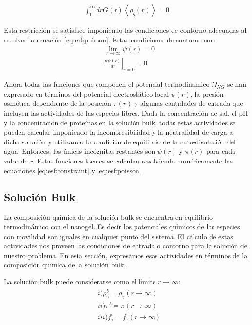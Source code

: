 \begin{align}
	\int_0^\infty{drG(r) \left<\rho_q(r)\right>} = 0
\end{align}

Esta restricci\'on se satisface imponiendo las condiciones de contorno adecuadas al resolver la ecuaci\'on \ref{eq:esf:poisson}. Estas condiciones de contorno son:
\begin{align}
	&  \lim_{r\to\infty}\psi(r) = 0 \\
	&  \left.\frac{d\psi(r)}{dr}\right|_{r=0} = 0
	\label{eq:esf:contorno}
	\end{align}
	

Ahora todas las funciones que componen el potencial termodin\'amico $\Omega_{NG}$ se han expresado en t\'erminos del potencial electrost\'atico local $\psi(r)$, la presi\'on osm\'otica dependiente de la posici\'on $\pi(r)$ y algunas cantidades de entrada que incluyen las actividades de las especies libres.
Dada la concentraci\'on de sal, el pH y la concentraci\'on de prote\'inas en la soluci\'on bulk, todas estas actividades se pueden calcular imponiendo la incompresibilidad y la neutralidad de carga a dicha soluci\'on y utilizando la condici\'on de equilibrio de la auto-disoluci\'on del agua.
Entonces, las \'unicas inc\'ognitas restantes son $\psi(r)$ y $\pi(r)$ para cada valor de $r$.
Estas funciones locales se calculan resolviendo num\'ericamente las ecuaciones \ref{eq:esf:constraint} y \ref{eq:esf:poisson}.
 

\subsection{Soluci\'on Bulk}\label{sec:esf:bulk}

La composici\'on qu\'imica de la soluci\'on bulk se encuentra en equilibrio termodin\'amico con el nanogel. Es decir los potenciales qu\'imicos de las especies con movilidad son iguales en cualquier punto del sistema. 
El c\'alculo de estas actividades nos proveen  las condiciones de entrada o contorno para la soluci\'on de nuestro problema.
En esta secci\'on, expresamos esas actividades en t\'erminos de la composici\'on qu\'imica de la soluci\'on bulk.

La soluci\'on bulk  puede considerarse como el l\'imite $r \rightarrow \infty$:
\begin{align}
	\begin{aligned}
		& i)\rho^b_\gamma =\rho_\gamma (r \rightarrow \infty) \\
		& ii) \pi^b = \pi(r \rightarrow \infty) \\
		& iii) f_\tau^b = f_\tau(r \rightarrow \infty)
	\end{aligned}
\end{align}

